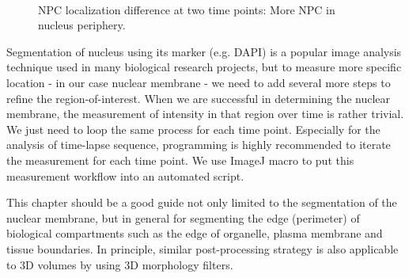 \begin{figure}[htbp]
 \centering
 \quad
  \\
 \caption{NPC localization difference at two time points: More NPC in nucleus periphery. }
 \label{fig:NucStrategy}
\end{figure}

Segmentation of nucleus using its marker (e.g. DAPI) is a popular image analysis technique used in many biological research projects, but to measure more specific location - in our case nuclear membrane - we need to add several more steps to refine the region-of-interest. When we are successful in determining the nuclear membrane, the measurement of intensity in that region over time is rather trivial. We just need to loop the same process for each time point. Especially for the analysis of time-lapse sequence, programming is highly recommended to iterate the measurement for each time point. We use ImageJ macro to put this measurement workflow into an automated script. 

This chapter should be a good guide not only limited to the segmentation of the nuclear membrane, but in general for segmenting the edge (perimeter) of biological compartments such as the edge of organelle, plasma membrane and tissue boundaries. In principle, similar post-processing strategy is also applicable to 3D volumes by using 3D morphology filters. 

